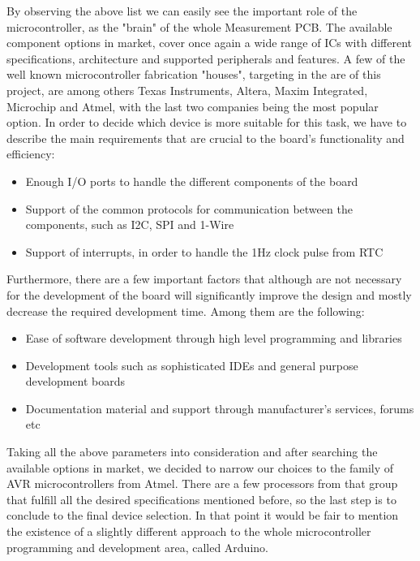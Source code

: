 By observing the above list we can easily see the important role of the microcontroller, as the "brain" of the whole Measurement PCB. The available component options in market, cover once again a wide range of ICs with different specifications, architecture and supported peripherals and features. A few of the well known microcontroller fabrication "houses", targeting in the are of this project, are among others Texas Instruments, Altera, Maxim Integrated, Microchip and Atmel, with the last two companies being the most popular option. In order to decide which device is more suitable for this task, we have to describe the main requirements that are crucial to the board's functionality and efficiency:

\begin{itemize}
    \item Enough I/O ports to handle the different components of the board
    \item Support of the common protocols for communication between the components, such as I2C, SPI and 1-Wire
    \item Support of interrupts, in order to handle the 1Hz clock pulse from RTC
\end{itemize}

Furthermore, there are a few important factors that although are not necessary for the development of the board will significantly improve the design and mostly decrease the required development time. Among them are the following:

\begin{itemize}
    \item Ease of software development through high level programming and libraries
    \item Development tools such as sophisticated IDEs and general purpose development boards
    \item Documentation material and support through manufacturer's services, forums etc
\end{itemize}

Taking all the above parameters into consideration and after searching the available options in market, we decided to narrow our choices to the family of AVR microcontrollers from Atmel. There are a few processors from that group that fulfill all the desired specifications mentioned before, so the last step is to conclude to the final device selection. In that point it would be fair to mention the existence of a slightly different approach to the whole microcontroller programming and development area, called Arduino.

